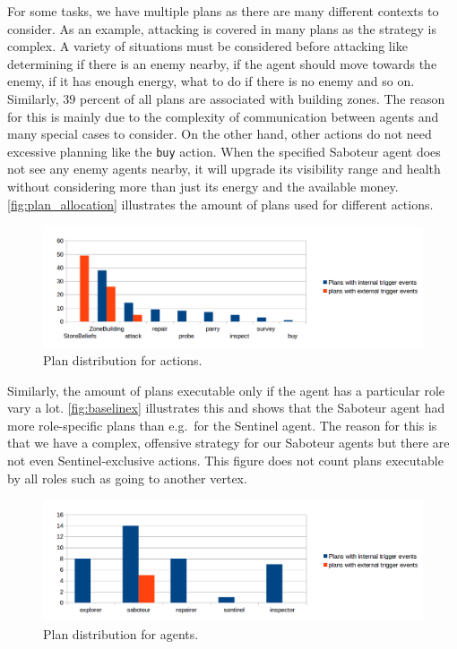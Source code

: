 For some tasks, we have multiple plans as there are many different contexts to consider.
As an example, attacking is covered in many plans as the strategy is complex.
A variety of situations must be considered before attacking like determining if there is an enemy nearby, if the agent should move towards the enemy, if it has enough energy, what to do if there is no enemy and so on.
Similarly, $39$ percent of all plans are associated with building zones.
The reason for this is mainly due to the complexity of communication between agents and many special cases to consider.
On the other hand, other actions do not need excessive planning like the \texttt{buy} action.
When the specified Saboteur agent does not see any enemy agents nearby, it will upgrade its visibility range and health without considering more than just its energy and the available money.
\autoref{fig:plan_allocation} illustrates the amount of plans used for different actions.
\begin{figure}
  \centering
  \includegraphics[width=\textwidth]{images/BDI_plan_distribution_action}
  \caption{Plan distribution for actions.}
  \label{fig:plan_allocation}
\end{figure}
Similarly, the amount of plans executable only if the agent has a particular role vary a lot.
\autoref{fig:baselinex} illustrates this and shows that the Saboteur agent had more role-specific plans than e.g.\ for the Sentinel agent.
The reason for this is that we have a complex, offensive strategy for our Saboteur agents but there are not even Sentinel-exclusive actions.
This figure does not count plans executable by all roles such as going to another vertex.
\begin{figure}
  \centering
  \includegraphics[width=\textwidth]{images/BDI_plan_distribution_role}
  \caption{Plan distribution for agents.}
  \label{fig:baselinex}
\end{figure}

